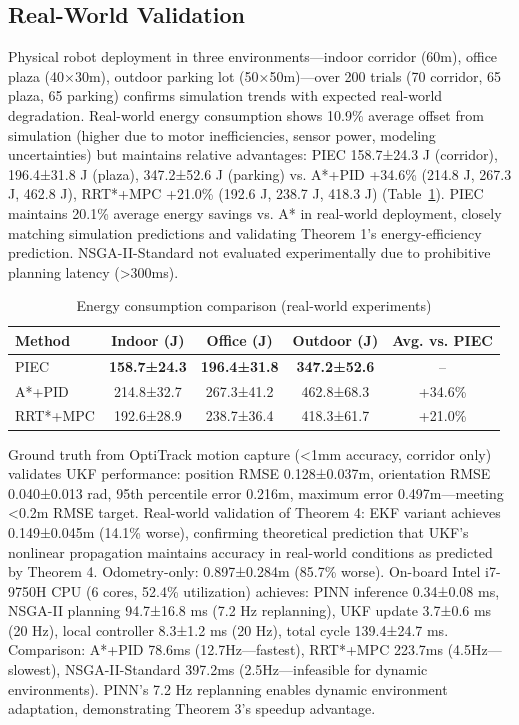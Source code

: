 \documentclass[pdflatex,sn-nature]{sn-jnl}%
\begin{document}
\subsection{Real-World Validation}

Physical robot deployment in three environments—indoor corridor (60m), office plaza (40×30m), outdoor parking lot (50×50m)—over 200 trials (70 corridor, 65 plaza, 65 parking) confirms simulation trends with expected real-world degradation. Real-world energy consumption shows 10.9\% average offset from simulation (higher due to motor inefficiencies, sensor power, modeling uncertainties) but maintains relative advantages: PIEC 158.7±24.3 J (corridor), 196.4±31.8 J (plaza), 347.2±52.6 J (parking) vs. A*+PID +34.6\% (214.8 J, 267.3 J, 462.8 J), RRT*+MPC +21.0\% (192.6 J, 238.7 J, 418.3 J) (Table~\ref{tab:energy_experimental}). PIEC maintains 20.1\% average energy savings vs. A* in real-world deployment, closely matching simulation predictions and validating Theorem 1's energy-efficiency prediction. NSGA-II-Standard not evaluated experimentally due to prohibitive planning latency (>300ms).

\begin{table}[h]
\centering
\caption{Energy consumption comparison (real-world experiments)}
\label{tab:energy_experimental}
\begin{tabular}{lcccc}
\toprule
\textbf{Method} & \textbf{Indoor (J)} & \textbf{Office (J)} & \textbf{Outdoor (J)} & \textbf{Avg. vs. PIEC} \\
\midrule
PIEC & \textbf{158.7±24.3} & \textbf{196.4±31.8} & \textbf{347.2±52.6} & -- \\
A*+PID & 214.8±32.7 & 267.3±41.2 & 462.8±68.3 & +34.6\% \\
RRT*+MPC & 192.6±28.9 & 238.7±36.4 & 418.3±61.7 & +21.0\% \\
\bottomrule
\end{tabular}
\end{table}

Ground truth from OptiTrack motion capture (<1mm accuracy, corridor only) validates UKF performance: position RMSE 0.128±0.037m, orientation RMSE 0.040±0.013 rad, 95th percentile error 0.216m, maximum error 0.497m—meeting <0.2m RMSE target. Real-world validation of Theorem 4: EKF variant achieves 0.149±0.045m (14.1\% worse), confirming theoretical prediction that UKF's nonlinear propagation maintains accuracy in real-world conditions as predicted by Theorem 4. Odometry-only: 0.897±0.284m (85.7\% worse). On-board Intel i7-9750H CPU (6 cores, 52.4\% utilization) achieves: PINN inference 0.34±0.08 ms, NSGA-II planning 94.7±16.8 ms (7.2 Hz replanning), UKF update 3.7±0.6 ms (20 Hz), local controller 8.3±1.2 ms (20 Hz), total cycle 139.4±24.7 ms. Comparison: A*+PID 78.6ms (12.7Hz—fastest), RRT*+MPC 223.7ms (4.5Hz—slowest), NSGA-II-Standard 397.2ms (2.5Hz—infeasible for dynamic environments). PINN's 7.2 Hz replanning enables dynamic environment adaptation, demonstrating Theorem 3's speedup advantage.
\end{document}
